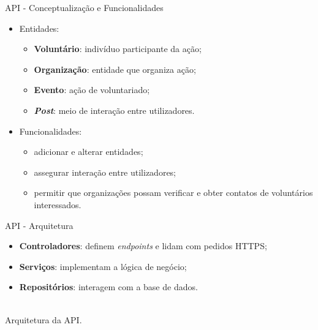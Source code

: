 \begin{frame}{API - Conceptualização e Funcionalidades}

\vspace*{-4em}

\begin{itemize}
	\item Entidades:
	\begin{itemize}
		\item \textbf{Voluntário}: indivíduo participante da ação;
		\item \textbf{Organização}: entidade que organiza ação;
		\item \textbf{Evento}: ação de voluntariado;
		\item \textbf{\textit{Post}}: meio de interação entre utilizadores.
	\end{itemize}

	\vspace*{1em}

	\item Funcionalidades:
	\begin{itemize}
		\item adicionar e alterar entidades;
		\item assegurar interação entre utilizadores;
		\item permitir que organizações possam verificar e obter contatos de voluntários interessados.
	\end{itemize}
\end{itemize}

\end{frame}

\begin{frame}{API - Arquitetura}

\vspace*{-3em}

\begin{itemize}
	\item \textbf{Controladores}: definem \textit{endpoints} e lidam com pedidos HTTPS;
	\item \textbf{Serviços}: implementam a lógica de negócio;
	\item \textbf{Repositórios}: interagem com a base de dados.
\end{itemize}

\centering
{}\\
{\small Arquitetura da API.}

\end{frame}